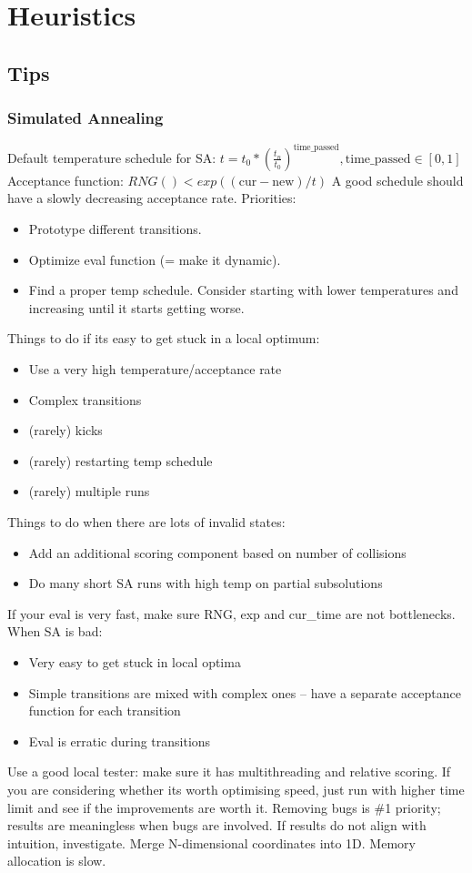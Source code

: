 \chapter{Heuristics}

\section{Tips}
	\subsection{Simulated Annealing}
	Default temperature schedule for SA: $t = t_0 * (\frac{t_n}{t_0})^{\text{time\_passed}}, \text{time\_passed} \in [0, 1]$
	Acceptance function: $RNG() < exp((\text{cur} - \text{new}) / t)$
	A good schedule should have a slowly decreasing acceptance rate. 
	Priorities:
	\begin{itemize}
		\item Prototype different transitions.
		\item Optimize eval function (= make it dynamic).
		\item Find a proper temp schedule. Consider starting with lower temperatures and increasing until it starts getting worse.
	\end{itemize}
	Things to do if its easy to get stuck in a local optimum:
	\begin{itemize}
		\item Use a very high temperature/acceptance rate
		\item Complex transitions
		\item (rarely) kicks
		\item (rarely) restarting temp schedule
		\item (rarely) multiple runs
	\end{itemize}
	Things to do when there are lots of invalid states:
	\begin{itemize}
		\item Add an additional scoring component based on number of collisions
		\item Do many short SA runs with high temp on partial subsolutions
	\end{itemize}
	If your eval is very fast, make sure RNG, exp and cur\_time are not bottlenecks.
	When SA is bad:
	\begin{itemize}
		\item Very easy to get stuck in local optima
		\item Simple transitions are mixed with complex ones -- have a separate acceptance function for each transition
		\item Eval is erratic during transitions
	\end{itemize}
	Use a good local tester: make sure it has multithreading and relative scoring.
	If you are considering whether its worth optimising speed, just run with higher time limit and see if the improvements are worth it.
	Removing bugs is \#1 priority; results are meaningless when bugs are involved. 
	If results do not align with intuition, investigate.
	Merge N-dimensional coordinates into 1D.
	Memory allocation is slow.

